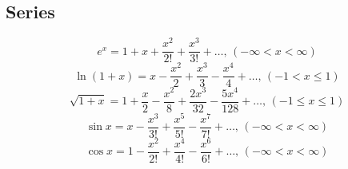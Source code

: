 \subsection{Series}
$$e^x = 1+x+\frac{x^2}{2!}+\frac{x^3}{3!}+\dots,\,(-\infty<x<\infty)$$
$$\ln(1+x) = x-\frac{x^2}{2}+\frac{x^3}{3}-\frac{x^4}{4}+\dots,\,(-1<x\leq1)$$
$$\sqrt{1+x} = 1+\frac{x}{2}-\frac{x^2}{8}+\frac{2x^3}{32}-\frac{5x^4}{128}+\dots,\,(-1\leq x\leq1)$$
$$\sin x = x-\frac{x^3}{3!}+\frac{x^5}{5!}-\frac{x^7}{7!}+\dots,\,(-\infty<x<\infty)$$
$$\cos x = 1-\frac{x^2}{2!}+\frac{x^4}{4!}-\frac{x^6}{6!}+\dots,\,(-\infty<x<\infty)$$

%
%
%
%
